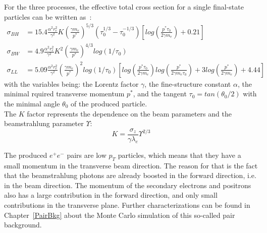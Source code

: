 For the three processes, the effective total cross section for a single final-state particles can be written as~\cite{PairBkg_cross_section}:
\begin{align}
 \sigma_{BH} &= 15.4\frac{\alpha^2 r_e^2}{\gamma^2}K  \left(\frac{\gamma m_e}{p^*}\right)^{5/3}(\tau_0^{1/3}-\tau_0^{-1/3})\left[log\left(\frac{p^*\tau_0}{2\gamma m_e}\right)+0.21\right]\\
 \sigma_{BW} &= 4.9\frac{\alpha^2 r_e^2}{\gamma^2}K^2  \left(\frac{\gamma m_e}{p^*}\right)^{4/3}  log(1/\tau_0)\\
 \sigma_{LL} &= 5.09\frac{\alpha^2 r_e^2}{\gamma^2} \left(\frac{\gamma m_e}{p^*}\right)^2 log(1/\tau_0) \left[log\left(\frac{p^*\tau_0}{2\gamma m_e}\right) log\left(\frac{p^*}{2\gamma m_e\tau_0}\right) + 3 log\left(\frac{p^*}{2\gamma m_e}\right) + 4.44\right]
\end{align}
with the variables being:
the Lorentz factor $\gamma$, 
the fine-structure constant $\alpha$, 
the minimal rquired transverse momentum $p^*$,
and the tangent $\tau_0=tan(\theta_0/2)$ with the minimal angle $\theta_0$ of the produced particle.
\\The $K$ factor represents the dependence on the beam parameters and the beamstrahlung parameter $\Upsilon$:
\begin{equation}
 K=\frac{\sigma_z}{\gamma\lambda_e}\Upsilon^{2/3}
\end{equation}


The produced $e^+e^-$ pairs are low $p_T$ particles, which means that they have a small momentum in the transverse beam direction.
The reason for that is the fact that the beamstrahlung photons are already boosted in the forward direction, i.e. in the beam direction.
The momentum of the secondary electrons and positrons also has a large contribution in the forward direction, and only small contributions in the transverse plane.
Further characterizations can be found in Chapter~\ref{PairBkg} about the Monte Carlo simulation of this so-called pair background.


